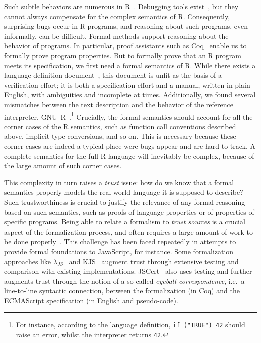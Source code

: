 \documentclass[
    sigplan,
    10pt,
    review, %
    natbib=false %
 ]{acmart}
\newcommand\newtext[1]{{\color{blue} #1}}
\begin{document}
Such subtle behaviors are numerous in R~\parencite{RInferno}.
Debugging tools exist~\parencite{mcpherson2014},
but they cannot always compensate for the complex semantics of R.
Consequently, surprising bugs occur in R programs, 
and reasoning about such programs, even informally, can be difficult.
%
\newtext{Formal methods support reasoning about the behavior of programs. In particular, proof assistants such as Coq~\parencite{Coq} enable us
to formally prove program properties.}
But to formally prove that an R program meets its specification,
we first need a formal semantics of R.
While there exists a language definition document~\parencite{team2000r}, this document is unfit as the basis of a verification effort; it is both a specification effort and a manual, written in plain English, with ambiguities and incomplete at times. Additionally, we found several mismatches between the text description and the behavior of the reference interpreter, GNU~R~\parencite{Rwebsite}.\footnote{For instance, according to the language definition, \texttt{if ("TRUE") 42} should raise an error, whilst the interpreter returns \texttt{42}.}
Crucially, the formal semantics should account for all the corner cases of the R semantics, such as function call conventions described above, implicit type conversions, and so on.
This is necessary because these corner cases are indeed a typical place were bugs appear and are hard to track.
A complete semantics for the full R language will inevitably be complex,
because of the large amount of such corner cases.

\newtext{This complexity in turn raises a {\em trust} issue: 
how do we know that a formal semantics properly models the real-world language it is supposed to describe? Such trustworthiness is crucial to justify the relevance of any formal reasoning based on such semantics, such as proofs of language properties or of properties of specific programs.} Being able to relate a formalism to {\em trust sources} is a crucial aspect of the formalization process, and often requires a large amount of work to be done properly~\parencite{leroy2014pip}. This challenge has been faced repeatedly in attempts to provide formal foundations to JavaScript, for instance.
%
Some formalization approaches like $\lambda_{JS}$~\cite{Guha2010} and KJS~\cite{kjs} augment trust through extensive testing and comparison with existing implementations. JSCert~\parencite{popl14jscert} also uses testing and further augments trust through the notion of a so-called {\em eyeball correspondence}, i.e.~a line-to-line syntactic connection, between the formalization (in Coq) and the ECMAScript specification (in English and pseudo-code).
\end{document}
